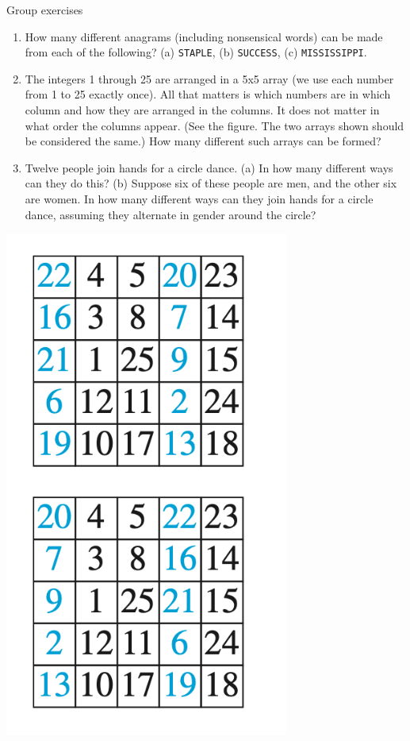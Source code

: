 \documentclass[10pt]{beamer}
\begin{document}
\begin{frame}{Group exercises}
\footnotesize 

\begin{minipage}{0.66\textwidth}
\begin{enumerate}
\item How many different anagrams (including nonsensical words) can be made from each of the following? (a) \texttt{STAPLE}, (b)  \texttt{SUCCESS}, (c) \texttt{MISSISSIPPI}.
\item The integers 1 through 25 are arranged in a 5x5 array (we use each number from 1 to 25 exactly once). All that matters is which numbers are in which column and how they are arranged in the columns.  It does not matter in what order the columns appear. (See the figure.  The two arrays shown should be considered the same.) How many different such arrays can be formed?
\item Twelve people join hands for a circle dance. 
(a) In how many different ways can they do this? (b) Suppose six of these people are men, and the other six are women. In how many different ways can they join hands for a circle dance, assuming they alternate in gender around the circle?
\end{enumerate}
\end{minipage}
\hfill 
\begin{minipage}{0.31\textwidth}
\includegraphics[width=0.7\textwidth]{images/partition_group_exercise.png}	
\end{minipage}
\end{frame}
\end{document}
